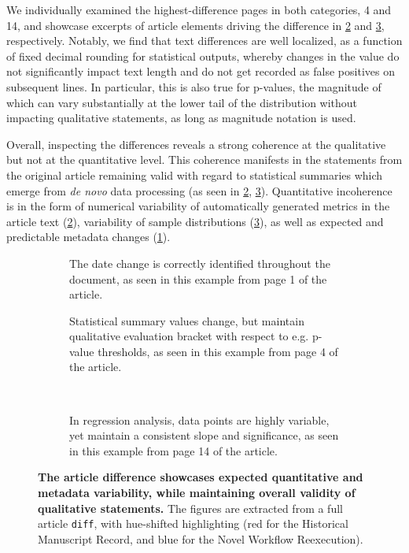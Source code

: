 We individually examined the highest-difference pages in both categories, 4 and 14, and showcase excerpts of article elements driving the difference in \cref{fig:diff_text} and \cref{fig:diff_fig}, respectively.
Notably, we find that text differences are well localized, as a function of fixed decimal rounding for statistical outputs, whereby changes in the value do not significantly impact text length and do not get recorded as false positives on subsequent lines.
In particular, this is also true for p-values, the magnitude of which can vary substantially at the lower tail of the distribution without impacting qualitative statements, as long as magnitude notation is used.


Overall, inspecting the differences reveals a strong coherence at the qualitative but not at the quantitative level.
This coherence manifests in the statements from the original article remaining valid with regard to statistical summaries which emerge from  \textit{de novo} data processing (as seen in \ref{fig:diff_text}, \ref{fig:diff_fig}).
Quantitative incoherence is in the form of numerical variability of automatically generated metrics in the article text (\ref{fig:diff_text}), variability of sample distributions (\ref{fig:diff_fig}), as well as expected and predictable metadata changes (\ref{fig:diff_date}).


\begin{figure}
	\centering
	\begin{subfigure}{0.49\textwidth}
		\centering
		\caption{
			The date change is correctly identified throughout the document, as seen in this example from page 1 of the article.
		}
		\label{fig:diff_date}
	\end{subfigure}
	\hfill
	\begin{subfigure}{0.49\textwidth}
		\centering
		\caption{
			Statistical summary values change, but maintain qualitative evaluation bracket with respect to e.g. p-value thresholds, as seen in this example from page 4 of the article.
		}
		\label{fig:diff_text}
	\end{subfigure}
	\\
	\vspace{1em}
	\begin{subfigure}{0.99\textwidth}
		\centering
		\caption{
			In regression analysis, data points are highly variable, yet maintain a consistent slope and significance, as seen in this example from page 14 of the article.
		}
		\label{fig:diff_fig}
	\end{subfigure}
	\caption{
		\textbf{The article difference showcases expected quantitative and metadata variability, while maintaining overall validity of qualitative statements.}
		The figures are extracted from a full article \texttt{diff}, with hue-shifted highlighting (red for the Historical Manuscript Record, and blue for the Novel Workflow Reexecution).
	}
	\label{fig:diff}
\end{figure}


